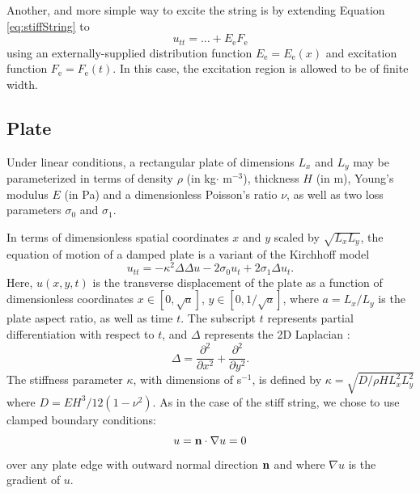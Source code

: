 \documentclass{article}
\begin{document}
Another, and more simple way to excite the string is by extending Equation \eqref{eq:stiffString} to
\begin{equation}
    \label{eq:excitedString} u_{tt} = \hdots + E_\text{e}F_\text{e}%
\end{equation}
using an externally-supplied distribution function $E_\text{e} = E_\text{e}(x)$ and excitation function $F_\text{e} = F_\text{e}(t)$. In this case, the excitation region is allowed to be of finite width.

\subsection{Plate}\label{subsec:platePDE}
Under linear conditions, a rectangular plate of dimensions $L_{x}$ and $L_{y}$ may be parameterized in terms of density $\rho$ (in kg$\cdot$ m$^{-3}$), thickness $H$ (in m), Young's modulus $E$ (in Pa) and a dimensionless Poisson's ratio $\nu$, as well as two loss parameters $\sigma_{0}$ and $\sigma_{1}$.%

In terms of dimensionless spatial coordinates $x$ and $y$ scaled by $\sqrt{L_{x}L_{y}}$, the equation of motion of a damped plate is a variant of the Kirchhoff model \cite{Graff}
\begin{equation}\label{eq:platePDE}
    u_{tt} = -\kappa^2 \Delta\Delta u - 2 \sigma_0 u_{t} + 2\sigma_1 \Delta u_{t}.
\end{equation}
Here, $u(x,y,t)$ is the transverse displacement of the plate as a function of dimensionless coordinates $x\in[0, \sqrt{a}]$, $y\in[0,1/\sqrt{a}]$, where $a = L_{x}/L_{y}$ is the plate aspect ratio, as well as time $t$. The subscript $t$ represents partial differentiation with respect to $t$, and $\Delta$ represents the 2D Laplacian \cite{Bilbao2009:NumericalSoundSynthesis}:
\begin{equation}
    \Delta  = \frac{\partial^2}{\partial x^2}+\frac{\partial^2}{\partial y^2}.
\end{equation}
The stiffness parameter $\kappa$, with dimensions of s$^{-1}$, is defined by $\kappa = \sqrt{D/\rho H L_{x}^2L_{y}^2}$ where $D = EH^3/12\left(1-\nu^2\right)$. As in the case of the stiff string, we chose to use clamped boundary conditions:
\begin{equation}
     u = {\bf n}\cdot \nabla u = 0 
\end{equation}
over any plate edge with outward normal direction ${\bf n}$ and where $\nabla u$ is the gradient of $u$. 
\end{document}
